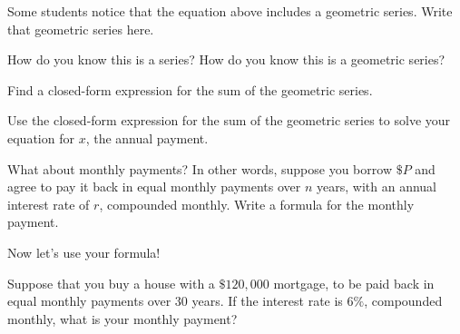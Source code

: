 \documentclass{ximera}
\begin{document}
\begin{question}
Some students notice that the equation above includes a geometric series.  Write that geometric series here.
\begin{freeResponse}
\end{freeResponse}
\end{question}

\begin{question}
How do you know this is a series?  How do you know this is a geometric series?   
\begin{freeResponse}
\end{freeResponse}
\end{question}

\begin{question}
Find a closed-form expression for the sum of the geometric series.  
\begin{freeResponse}
\end{freeResponse}
\end{question}



\begin{question}
Use the closed-form expression for the sum of the geometric series to solve your equation for $x$, the annual payment.   
\begin{freeResponse}
\end{freeResponse}
\end{question}

\begin{question}
What about monthly payments?  In other words, suppose you borrow $\$P$ and agree to pay it back in equal monthly
payments over $n$ years, with an annual interest rate of $r$, compounded monthly.  
Write a formula for the monthly payment.  
\begin{freeResponse}
\end{freeResponse}
\end{question}

Now let's use your formula!  

\begin{question}
Suppose that you buy a house with a $\$120,000$ mortgage, to be
paid back in equal monthly payments over $30$ years.  If the interest
rate is $6\%$, compounded monthly, what is your monthly payment? 
\end{question}
\end{document}
